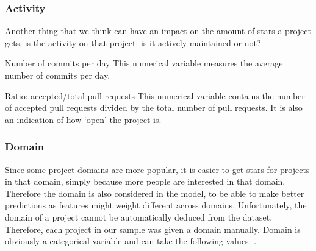 
    \subsubsection{Activity}
        Another thing that we think can have an impact on the amount of stars a project gets, is the activity on that project: is it actively maintained or not?
    \begin{LaTeXdescription}
        \item[Number of commits per day]
            This numerical variable measures the average number of commits per day.
        \item[Ratio: accepted/total pull requests]
            This numerical variable contains the number of accepted pull requests divided by the total number of pull requests. It is also an indication of how `open' the project is.
    \end{LaTeXdescription}


 
    \subsubsection{Domain}
        Since some project domains are more popular, it is easier to get stars for projects in that domain, simply because more people are interested in that domain.
        Therefore the domain is also considered in the model, to be able to make better predictions as features might weight different across domains.
        Unfortunately, the domain of a project cannot be automatically deduced from the dataset. 
        Therefore, each project in our sample was given a domain manually. Domain is obviously a categorical variable and can take the following values: .

